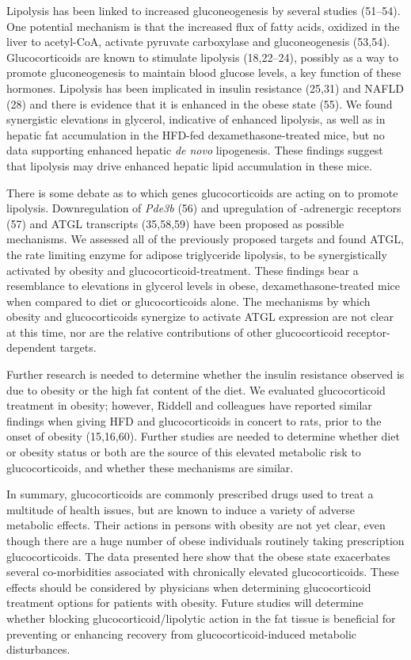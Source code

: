 \documentclass[11pt]{article} %
\begin{document}
Lipolysis has been linked to increased gluconeogenesis by several
studies (51--54). One potential mechanism is that the increased flux of
fatty acids, oxidized in the liver to acetyl-CoA, activate pyruvate
carboxylase and gluconeogenesis (53,54). Glucocorticoids are known to
stimulate lipolysis (18,22--24), possibly as a way to promote
gluconeogenesis to maintain blood glucose levels, a key function of
these hormones. Lipolysis has been implicated in insulin resistance
(25,31) and NAFLD (28) and there is evidence that it is enhanced in the
obese state (55). We found synergistic elevations in glycerol,
indicative of enhanced lipolysis, as well as in hepatic fat accumulation
in the HFD-fed dexamethasone-treated mice, but no data supporting
enhanced hepatic \emph{de novo} lipogenesis. These findings suggest that
lipolysis may drive enhanced hepatic lipid accumulation in these mice.

There is some debate as to which genes glucocorticoids are acting on to
promote lipolysis. Downregulation of \emph{Pde3b} (56) and upregulation
of -adrenergic receptors (57) and ATGL transcripts (35,58,59) have been
proposed as possible mechanisms. We assessed all of the previously
proposed targets and found ATGL, the rate limiting enzyme for adipose
triglyceride lipolysis, to be synergistically activated by obesity and
glucocorticoid-treatment. These findings bear a resemblance to
elevations in glycerol levels in obese, dexamethasone-treated mice when
compared to diet or glucocorticoids alone. The mechanisms by which
obesity and glucocorticoids synergize to activate ATGL expression are
not clear at this time, nor are the relative contributions of other
glucocorticoid receptor-dependent targets.

Further research is needed to determine whether the insulin resistance
observed is due to obesity or the high fat content of the diet. We
evaluated glucocorticoid treatment in obesity; however, Riddell and
colleagues have reported similar findings when giving HFD and
glucocorticoids in concert to rats, prior to the onset of obesity
(15,16,60). Further studies are needed to determine whether diet or
obesity status or both are the source of this elevated metabolic risk to
glucocorticoids, and whether these mechanisms are similar.

In summary, glucocorticoids are commonly prescribed drugs used to treat
a multitude of health issues, but are known to induce a variety of
adverse metabolic effects. Their actions in persons with obesity are not
yet clear, even though there are a huge number of obese individuals
routinely taking prescription glucocorticoids. The data presented here
show that the obese state exacerbates several co-morbidities associated
with chronically elevated glucocorticoids. These effects should be
considered by physicians when determining glucocorticoid treatment
options for patients with obesity. Future studies will determine whether
blocking glucocorticoid/lipolytic action in the fat tissue is beneficial
for preventing or enhancing recovery from glucocorticoid-induced
metabolic disturbances.
\end{document}
